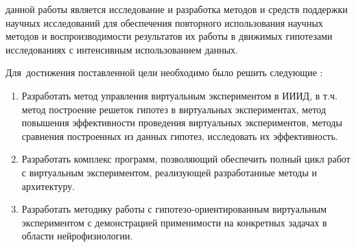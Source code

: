 


{\aim} данной работы является исследование и разработка методов и средств поддержки научных 
исследований для обеспечения повторного использования научных методов и воспроизводимости результатов 
их работы в движимых гипотезами исследованиях с интенсивным использованием данных.


Для~достижения поставленной цели необходимо было решить следующие {\tasks}:
\begin{enumerate}[beginpenalty=10000] %
    \item Разработать метод управления виртуальным экспериментом в ИИИД, в т.ч. метод построение решеток 
            гипотез в виртуальных экспериментах, метод повышения эффективности проведения виртуальных 
            экспериментов, методы сравнения построенных из данных гипотез, исследовать их эффективность.
    \item Разработать комплекс программ, позволяющий обеспечить полный цикл работ с виртуальным экспериментом, 
            реализующей разработанные методы и архитектуру.
    \item Разработать методику работы с гипотезо-ориентированным виртуальным экспериментом с демонстрацией 
            применимости на конкретных задачах в области нейрофизиологии.
\end{enumerate}


